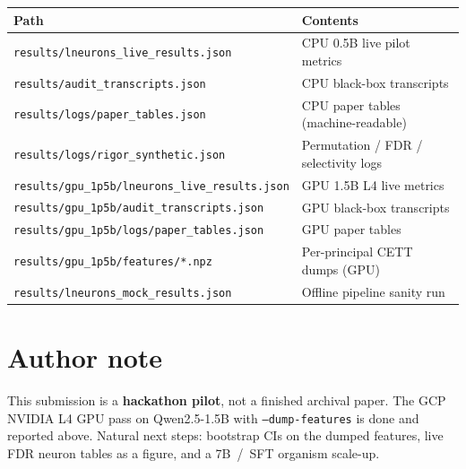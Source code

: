 \documentclass[11pt,a4paper]{article}
\begin{document}
\begin{center}
\begin{tabular}{@{}lp{8.2cm}@{}}
\toprule
\textbf{Path} & \textbf{Contents} \\
\midrule
\texttt{results/lneurons\_live\_results.json} & CPU 0.5B live pilot metrics \\
\texttt{results/audit\_transcripts.json} & CPU black-box transcripts \\
\texttt{results/logs/paper\_tables.json} & CPU paper tables (machine-readable) \\
\texttt{results/logs/rigor\_synthetic.json} & Permutation / FDR / selectivity logs \\
\texttt{results/gpu\_1p5b/lneurons\_live\_results.json} & GPU 1.5B L4 live metrics \\
\texttt{results/gpu\_1p5b/audit\_transcripts.json} & GPU black-box transcripts \\
\texttt{results/gpu\_1p5b/logs/paper\_tables.json} & GPU paper tables \\
\texttt{results/gpu\_1p5b/features/*.npz} & Per-principal CETT dumps (GPU) \\
\texttt{results/lneurons\_mock\_results.json} & Offline pipeline sanity run \\
\bottomrule
\end{tabular}
\end{center}

\section{Author note}
This submission is a \textbf{hackathon pilot}, not a finished archival paper.
The GCP NVIDIA L4 GPU pass on Qwen2.5-1.5B with \texttt{--dump-features} is done and reported above.
Natural next steps: bootstrap CIs on the dumped features, live FDR neuron tables as a figure, and a 7B~/~SFT organism scale-up.
\end{document}
